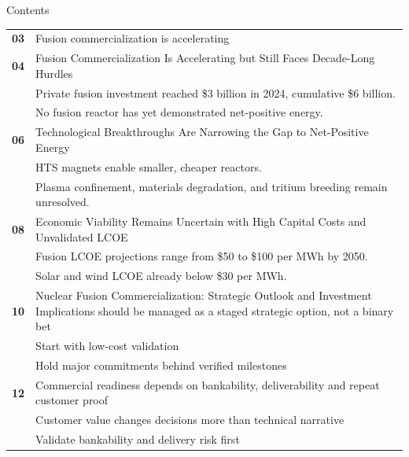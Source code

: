 \documentclass[10pt,a4paper]{article}
\begin{document}
\clearpage
{\sffamily\fontsize{26}{31}\selectfont\color{BONavy} Contents}\par\vspace{10pt}
\begin{tabularx}{\linewidth}{p{14mm}Y}
\textcolor{BOGreen}{\bfseries 03} & Fusion commercialization is accelerating \\[7pt]
\textcolor{BOGreen}{\bfseries 04} & Fusion Commercialization Is Accelerating but Still Faces Decade-Long Hurdles \\[5pt]
 & {\scriptsize\color{BOMuted} Private fusion investment reached \$3 billion in 2024, cumulative \$6 billion.} \\[1pt]
 & {\scriptsize\color{BOMuted} No fusion reactor has yet demonstrated net-positive energy.} \\[1pt]
\textcolor{BOGreen}{\bfseries 06} & Technological Breakthroughs Are Narrowing the Gap to Net-Positive Energy \\[5pt]
 & {\scriptsize\color{BOMuted} HTS magnets enable smaller, cheaper reactors.} \\[1pt]
 & {\scriptsize\color{BOMuted} Plasma confinement, materials degradation, and tritium breeding remain unresolved.} \\[1pt]
\textcolor{BOGreen}{\bfseries 08} & Economic Viability Remains Uncertain with High Capital Costs and Unvalidated LCOE \\[5pt]
 & {\scriptsize\color{BOMuted} Fusion LCOE projections range from \$50 to \$100 per MWh by 2050.} \\[1pt]
 & {\scriptsize\color{BOMuted} Solar and wind LCOE already below \$30 per MWh.} \\[1pt]
\textcolor{BOGreen}{\bfseries 10} & Nuclear Fusion Commercialization: Strategic Outlook and Investment Implications should be managed as a staged strategic option, not a binary bet \\[5pt]
 & {\scriptsize\color{BOMuted} Start with low-cost validation} \\[1pt]
 & {\scriptsize\color{BOMuted} Hold major commitments behind verified milestones} \\[1pt]
\textcolor{BOGreen}{\bfseries 12} & Commercial readiness depends on bankability, deliverability and repeat customer proof \\[5pt]
 & {\scriptsize\color{BOMuted} Customer value changes decisions more than technical narrative} \\[1pt]
 & {\scriptsize\color{BOMuted} Validate bankability and delivery risk first} \\[1pt]

\end{tabularx}
\end{document}
